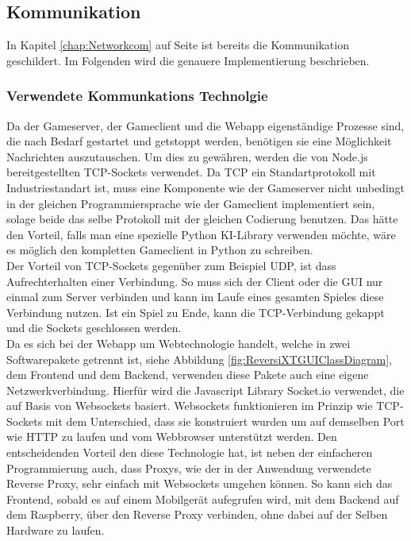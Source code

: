 \documentclass[12pt,a4paper,bibliography=totocnumbered,listof=totocnumbered]{article}
\begin{document}
\subsection{Kommunikation}
In Kapitel \ref{chap:Networkcom} auf Seite \pageref{chap:Networkcom} ist bereits die Kommunikation geschildert. Im Folgenden wird die genauere Implementierung beschrieben.

\subsubsection{Verwendete Kommunkations Technolgie}
Da der Gameserver, der Gameclient und die Webapp eigenständige Prozesse sind, die nach Bedarf gestartet und getstoppt werden, benötigen sie eine 
Möglichkeit Nachrichten auszutauschen. Um dies zu gewähren, werden die von Node.js bereitgestellten TCP-Sockets verwendet. 
Da TCP ein Standartprotokoll mit Industriestandart ist, muss eine Komponente wie der Gameserver nicht unbedingt in der gleichen Programmiersprache 
wie der Gameclient implementiert sein, solage beide das selbe Protokoll mit der gleichen Codierung benutzen.
Das hätte den Vorteil, falls man eine spezielle Python KI-Library verwenden möchte, wäre es möglich den kompletten Gameclient in Python zu schreiben.
\\
Der Vorteil von TCP-Sockets gegenüber zum Beispiel UDP, ist dass Aufrechterhalten einer Verbindung. So muss sich der Client oder die GUI nur einmal zum Server verbinden 
und kann im Laufe eines gesamten Spieles diese Verbindung nutzen. Ist ein Spiel zu Ende, kann die TCP-Verbindung gekappt und die 
Sockets geschlossen werden. 
\\
Da es sich bei der Webapp um Webtechnologie handelt, welche in zwei Softwarepakete getrennt ist, siehe Abbildung \ref{fig:ReversiXTGUIClassDiagram}, dem Frontend und dem Backend, verwenden 
diese Pakete auch eine eigene Netzwerkverbindung. Hierfür wird die Javascript Library Socket.io verwendet, die auf Basis von Websockets basiert.
Websockets funktionieren im Prinzip wie TCP-Sockets mit dem Unterschied, dass sie konstruiert wurden um auf demselben Port wie HTTP zu laufen und vom 
Webbrowser unterstützt werden. Den entscheidenden Vorteil den diese Technologie hat, ist neben der einfacheren Programmierung auch, dass Proxys, 
wie der in der Anwendung verwendete Reverse Proxy, sehr einfach mit Websockets umgehen können. So kann sich das Frontend, sobald es auf einem 
Mobilgerät aufegrufen wird, mit dem Backend auf dem Raspberry, über den Reverse Proxy verbinden, ohne dabei auf der Selben Hardware zu laufen.
\end{document}
